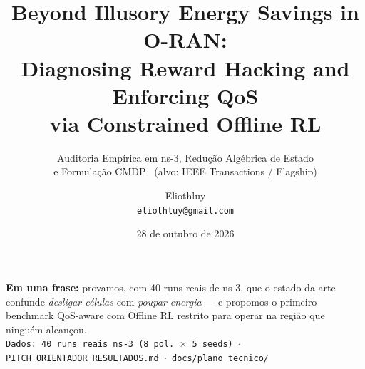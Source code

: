 \documentclass[aspectratio=169,10pt,xcolor={dvipsnames,table}]{beamer}
\title[Beyond Illusory Energy Savings in O-RAN]{Beyond Illusory Energy Savings in O-RAN:\\
Diagnosing Reward Hacking and Enforcing QoS\\ via Constrained Offline RL}
\subtitle{Auditoria Emp\'irica em ns-3, Redu\c{c}\~ao Alg\'ebrica de Estado\\ e Formula\c{c}\~ao CMDP \ (\footnotesize alvo: IEEE Transactions / Flagship)}
\author{Eliothluy\\{\small\texttt{eliothluy@gmail.com}}}
\institute[LaCIS/ITEC/UFPA]{LaCIS\ --\ ITEC\ --\ Universidade Federal do Par\'a (UFPA)}
\date{28 de outubro de 2026}
\newcommand{\datapath}[1]{{\scriptsize\color{darkgray}\texttt{#1}}}
\begin{document}
\begin{frame}
  \titlepage
  \begin{center}
    {\small\textbf{Em uma frase:} provamos, com 40 runs reais de ns-3, que o estado
    da arte confunde \emph{desligar c\'elulas} com \emph{poupar energia} --- e
    propomos o primeiro benchmark QoS-aware com Offline RL restrito para operar
    na regi\~ao que ningu\'em alcan\c{c}ou.}\\[2mm]
    \datapath{Dados: 40 runs reais ns-3 (8 pol. $\times$ 5 seeds) $\cdot$ PITCH\_ORIENTADOR\_RESULTADOS.md $\cdot$ docs/plano\_tecnico/}
  \end{center}
\end{frame}
\end{document}
